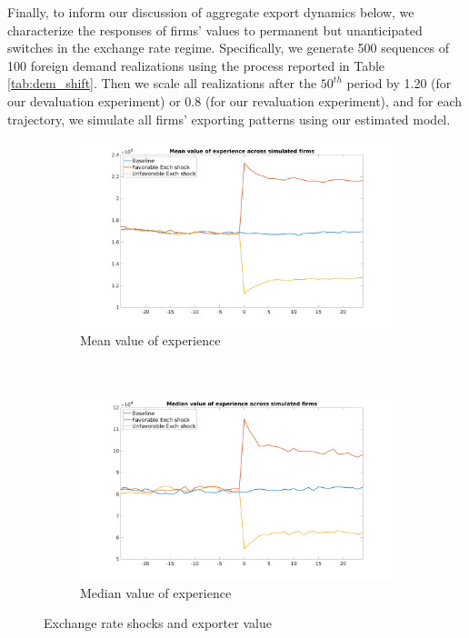 \documentclass[12pt]{article}
\begin{document}
Finally, to inform our discussion of aggregate export dynamics below, we characterize the responses of firms' values to permanent but unanticipated switches in the exchange rate regime. Specifically, we generate 500 sequences of 100 foreign demand realizations using the process reported in Table \ref{tab:dem_shift}. Then we scale all realizations after the $50^{th}$ period by 1.20 (for our devaluation experiment) or 0.8 (for our revaluation experiment), and for each trajectory, we simulate all firms' exporting patterns using our estimated model. 
 
\begin{figure}[tbp]
\centering
\begin{subfigure}[b]{0.45\textwidth}
        \centering
        \includegraphics[width=\textwidth]{figures/intangible_value_per_firm}
        \caption{Mean value of experience}
    \end{subfigure} ~ 
\begin{subfigure}[b]{0.45\textwidth}
        \centering
        \includegraphics[width=\textwidth]{figures/intangible_value_per_firm_median}
        \caption{Median value of experience}
    \end{subfigure} \newline
\caption{Exchange rate shocks and exporter value}
\label{fig:avg_value}
\end{figure}
\end{document}
